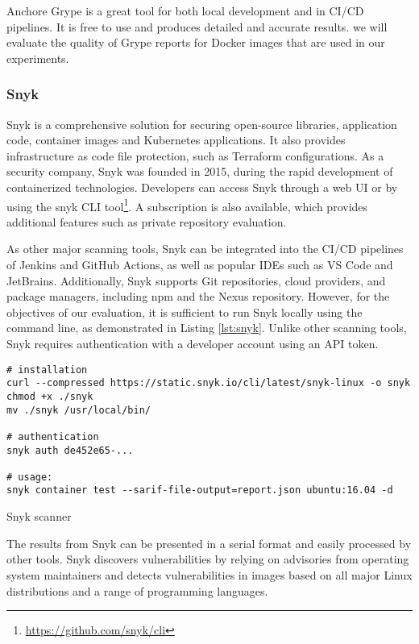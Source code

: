 Anchore Grype is a great tool for both local development and in CI/CD pipelines. It is free to use and produces detailed and accurate results. we will evaluate the quality of Grype reports for Docker images that are used in our experiments.


\subsubsection{Snyk}

Snyk is a comprehensive solution for securing open-source libraries, application code, container images and Kubernetes applications. It also provides infrastructure as code file protection, such as Terraform configurations. As a security company, Snyk was founded in 2015, during the rapid development of containerized technologies. Developers can access Snyk through a web UI or by using the snyk CLI tool\footnote{\url{https://github.com/snyk/cli}}. A subscription is also available, which provides additional features such as private repository evaluation.


As other major scanning tools, Snyk can be integrated into the CI/CD pipelines of Jenkins and GitHub Actions, as well as popular IDEs such as VS Code and JetBrains. Additionally, Snyk supports Git repositories, cloud providers, and package managers, including npm and the Nexus repository. However, for the objectives of our evaluation, it is sufficient to run Snyk locally using the command line, as demonstrated in Listing \ref{lst:snyk}. Unlike other scanning tools, Snyk requires authentication with a developer account using an API token.

\begin{listing}[htp]
    \centering
    \begin{minipage}{0.9\linewidth}
        \begin{verbatim}
# installation
curl --compressed https://static.snyk.io/cli/latest/snyk-linux -o snyk
chmod +x ./snyk
mv ./snyk /usr/local/bin/

# authentication
snyk auth de452e65-...

# usage:
snyk container test --sarif-file-output=report.json ubuntu:16.04 -d
        \end{verbatim}
    \end{minipage}
    \caption{Snyk scanner}
    \label{lst:snyk}
\end{listing}

The results from Snyk can be presented in a serial format and easily processed by other tools. Snyk discovers vulnerabilities by relying on advisories from operating system maintainers and detects vulnerabilities in images based on all major Linux distributions and a range of programming languages.

